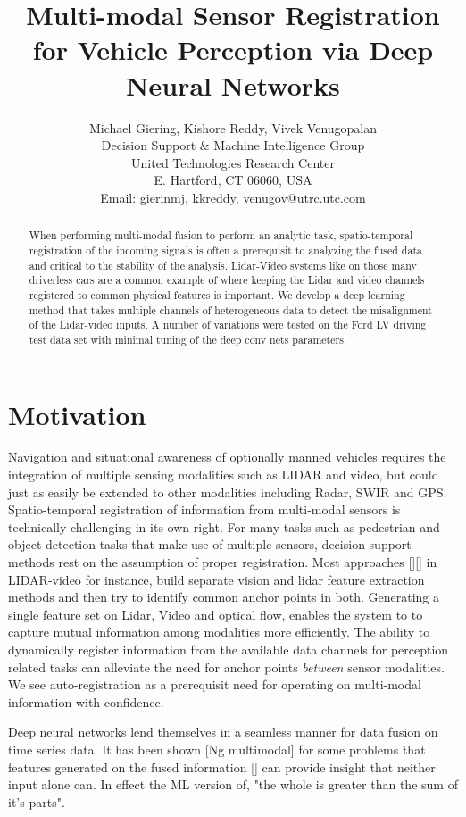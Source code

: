 \documentclass{article}
\title{Multi-modal Sensor Registration for Vehicle Perception via Deep Neural Networks}
\author{Michael Giering, Kishore Reddy, Vivek Venugopalan\\
Decision Support \& Machine Intelligence Group \\
United Technologies Research Center\\
E. Hartford, CT 06060, USA \\
Email: {gierinmj, kkreddy, venugov}@utrc.utc.com}
\begin{document}
\maketitle

\begin{abstract}
When performing multi-modal fusion to perform an analytic task, spatio-temporal registration of the incoming signals is often a prerequisit to analyzing the fused data and critical to the stability of the analysis. Lidar-Video systems like on those many driverless cars are a common example of where keeping the Lidar and video channels registered to common physical features is important. We develop a deep learning method that takes multiple channels of heterogeneous data to detect the misalignment of the Lidar-video inputs. A number of variations were tested on the Ford LV driving test data set with minimal tuning of the deep conv nets parameters. 

\end{abstract}

\section{Motivation} %
\label{sec:motivation}
Navigation and situational awareness of optionally manned vehicles requires the integration of multiple sensing modalities such as LIDAR and video, but could just as easily be extended to other modalities including Radar, SWIR and GPS. Spatio-temporal registration of information from multi-modal sensors is technically challenging in its own right. For many tasks such as pedestrian and object detection tasks that make use of multiple sensors, decision support methods rest on the assumption of proper registration. Most approaches [][] in LIDAR-video for instance, build separate vision and lidar feature extraction methods and then try to identify common anchor points in both. Generating a single feature set on Lidar, Video and optical flow, enables the system to to capture mutual information among modalities more efficiently. The ability to dynamically register information from the available data channels for perception related tasks can alleviate the need for anchor points \emph{between} sensor modalities. We see auto-registration as a prerequisit need for operating on multi-modal information with confidence.

Deep neural networks lend themselves in a seamless manner for data fusion on time series data. It has been shown [Ng multimodal] for some problems that features generated on the fused information [] can provide insight that neither input alone can. In effect the ML version of, "the whole is greater than the sum of it's parts". 
\end{document}
